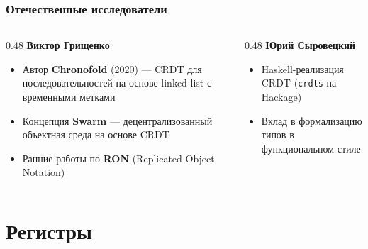 \documentclass{beamer}
\begin{document}
\begin{frame}
\frametitle{Отечественные исследователи}

\begin{columns}
\begin{column}{0.48\textwidth}
\textbf{Виктор Грищенко}\\
\begin{itemize}
  \item Автор \textbf{Chronofold} (2020) — CRDT для последовательностей на основе linked list с временными метками
  \item Концепция \textbf{Swarm} — децентрализованный объектная среда на основе CRDT
  \item Ранние работы по \textbf{RON} (Replicated Object Notation)
\end{itemize}
\end{column}
\begin{column}{0.48\textwidth}
\textbf{Юрий Сыровецкий}
\begin{itemize}
  \item Haskell-реализация CRDT (\texttt{crdts} на Hackage)
  \item Вклад в формализацию типов в функциональном стиле
\end{itemize}

\end{column}
\end{columns}


\end{frame}

\section{Регистры}
\end{document}
